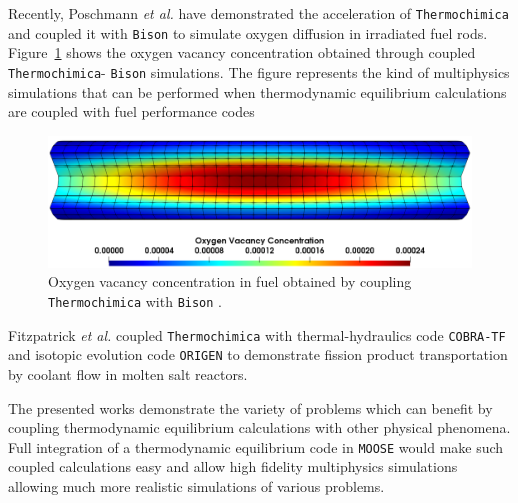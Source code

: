 	Recently, Poschmann \textit{et al.} \cite{Poschmann:2019aa} have demonstrated the acceleration of \texttt{Thermochimica} and coupled it with \texttt{Bison} to simulate oxygen diffusion in irradiated fuel rods. Figure~\ref{fig:ovac} shows the oxygen vacancy concentration obtained through coupled \texttt{Thermochimica}- \texttt{Bison} simulations. The figure represents the kind of multiphysics simulations that can be performed when thermodynamic equilibrium calculations are coupled with fuel performance  codes
	\begin{figure}[htbp]
		\begin{center}
		\includegraphics[width=\textwidth]{figures/O_M}
		\caption{Oxygen vacancy concentration in  fuel obtained by coupling \texttt{Thermochimica} with \texttt{Bison}  \cite{Poschmann:2019aa}.}
		\label{fig:ovac}
		\end{center}
	\end{figure}

	Fitzpatrick \textit{et al.} \cite{Fitzpatrick18} coupled \texttt{Thermochimica} with thermal-hydraulics code \texttt{COBRA-TF} and isotopic evolution code \texttt{ORIGEN} to demonstrate fission product transportation by coolant flow in molten salt reactors.

	The presented works demonstrate the variety of problems which can benefit by coupling thermodynamic equilibrium calculations with other physical phenomena. Full integration of a thermodynamic equilibrium code in \texttt{MOOSE} would make such coupled calculations easy and allow high fidelity multiphysics simulations allowing much more realistic simulations of various problems.

